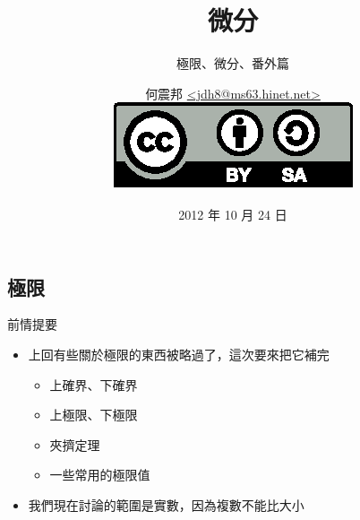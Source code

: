 \documentclass{beamer}
\begin{document}
\begin{CJK}{UTF8}{bsmi}
\title{微分}
\subtitle{極限、微分、番外篇}
\author[何震邦]{何震邦 \href{mailto:jdh8@ms63.hinet.net}{\textless jdh8@ms63.hinet.net\textgreater}\\
    \href{http://creativecommons.org/licenses/by-sa/3.0/tw/deed.zh\textunderscore TW}{\includegraphics{by-sa.eps}}}
\date{2012 年 10 月 24 日}
\maketitle

\section{極限}
\begin{frame}{前情提要}
  \begin{itemize}
    \item 上回有些關於極限的東西被略過了，這次要來把它補完
      \begin{itemize}
      \item 上確界、下確界
      \item 上極限、下極限
      \item 夾擠定理
      \item 一些常用的極限值
      \end{itemize}
    \item 我們現在討論的範圍是實數，因為複數不能比大小
  \end{itemize}
\end{frame}


\end{CJK}
\end{document}
